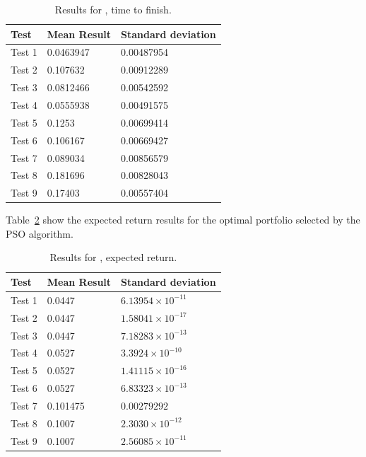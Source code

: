 \documentclass{pdfmx4020}
\begin{document}
        \begin{table}[H]
          \setlength{\extrarowheight}{2.0pt}
          \begin{tabular}{|l|l|l|}
            \hline
            Test & Mean Result & Standard deviation \\
            \hline
            Test 1 & 0.0463947 & 0.00487954 \\
            \hline
            Test 2 & 0.107632 & 0.00912289 \\
            \hline
            Test 3 & 0.0812466 & 0.00542592 \\
            \hline
            Test 4 & 0.0555938 & 0.00491575 \\
            \hline
            Test 5 & 0.1253 & 0.00699414 \\
            \hline
            Test 6 & 0.106167 & 0.00669427 \\
            \hline
            Test 7 & 0.089034 & 0.00856579 \\
            \hline
            Test 8 & 0.181696 & 0.00828043 \\
            \hline
            Test 9 & 0.17403 & 0.00557404 \\
            \hline
          \end{tabular}
          \caption{Results for , time to finish.}
          \label{table:time_results}
        \end{table}
      Table~\ref{table:expect_return_results} show the expected return results for the optimal portfolio selected by the PSO algorithm.
        \begin{table}[H]
          \setlength{\extrarowheight}{2.0pt}
          \begin{tabular}{|l|l|l|}
            \hline
            Test & Mean Result & Standard deviation \\
            \hline
            Test 1 & 0.0447 & $6.13954\times10^{-11}$ \\
            \hline
            Test 2 & 0.0447 & $1.58041\times10^{-17}$ \\
            \hline
            Test 3 & 0.0447 & $7.18283\times10^{-13}$ \\
            \hline
            Test 4 & 0.0527 & $3.3924\times10^{-10}$ \\
            \hline
            Test 5 & 0.0527 & $1.41115\times10^{-16}$ \\
            \hline
            Test 6 & 0.0527 & $6.83323\times10^{-13}$ \\
            \hline
            Test 7 & 0.101475 & $0.00279292$ \\
            \hline
            Test 8 & 0.1007 & $2.3030\times10^{-12}$ \\
            \hline
            Test 9 & 0.1007 & $2.56085\times10^{-11}$ \\
            \hline
          \end{tabular}
          \caption{Results for , expected return.}
          \label{table:expect_return_results}
        \end{table}
\end{document}
